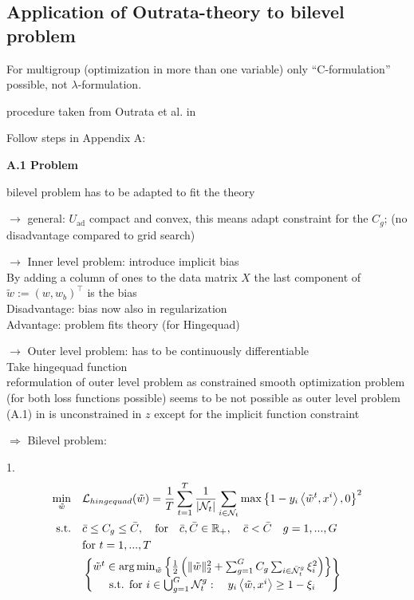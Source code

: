 \subsection{Application of Outrata-theory to bilevel problem}

\begin{remark}
	For multigroup (optimization in more than one variable) only ``C-formulation'' possible, not \(\lambda\)-formulation.
\end{remark}

procedure taken from Outrata et al. in \cite{Outrata1998}

Follow steps in Appendix A:

\textbf{A.1 Problem }

bilevel problem has to be adapted to fit the theory

\(\to\) general: \(U_{\text{ad}}\) compact and convex, this means adapt constraint for the \(C_g\); (no disadvantage compared to grid search)

\(\to\) Inner level problem: introduce implicit bias \\
By adding a column of ones to the data matrix \(X\) the last component of \(\tilde{w}:=(w,w_b)^{\top}\) is the bias \\
Disadvantage: bias now also in regularization \\
Advantage: problem fits theory (for Hingequad)

\(\to\) Outer level problem: has to be continuously differentiable \\
Take hingequad function\\
reformulation of outer level problem as constrained smooth optimization problem (for both loss functions possible) seems to be not possible as outer level problem (A.1) in \cite{Outrata1998} is unconstrained in \(z\) except for the implicit function constraint

\(\Rightarrow\) Bilevel problem:

1.
\begin{equation}
\begin{split}
	\min_{\tilde{w}} \quad &  \mathcal{L}_{hingequad}(\tilde{w}) = \frac{1}{T}\sum_{t=1}^T\frac{1}{|\mathcal{N}_t|}\sum_{i \in \mathcal{N}_t}{\max\left\{1-y_i\left\langle \tilde{w}^t,x^i\right\rangle,0\right\}^2}\\
	\text{s.t.} \quad & \bar{c} \leq C_g \leq \bar{C}, \quad \text{for} \quad \bar{c},\bar{C} \in \mathbb{R}_+, \quad \bar{c} < \bar{C}\quad g = 1,...,G\\
	& \text{for } t = 1,...,T \\
	& \begin{Bmatrix}
		\tilde{w}^t \in \operatorname*{arg\,min}_{\tilde{w}}\left\{ \frac{1}{2} \left(\|\tilde{w}\|^2_2+\sum_{g=1}^G C_g\sum_{i\in \bar{\mathcal{N}}^g_t}\xi_i^2\right)\right\} \\
		\text{s.t. for } i \in \bigcup_{g=1}^G \mathcal{N}_t^g: \quad y_i\left\langle \tilde{w},x^i\right\rangle \geq 1 - \xi_i
	\end{Bmatrix}
\end{split}
\label{bilevel_1}
\end{equation}

